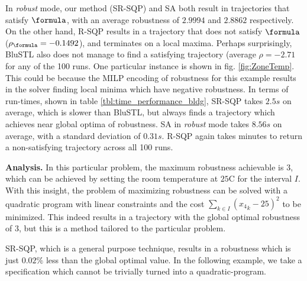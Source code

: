In \textit{robust} mode, our method (SR-SQP) and SA both result in trajectories that satisfy $\formula$, with an average robustness of $2.9994$ and $2.8862$ respectively. On the other hand, R-SQP results in a trajectory that does not satisfy $\formula$ ($\rob_{\formula} = -0.1492$), and terminates on a local maxima. Perhaps surprisingly, BluSTL also does not manage to find a satisfying trajectory (average $\rho=-2.71$ for any of the 100 runs. One particular instance is shown in fig. \ref{fig:ZoneTemp}. This could be because the MILP encoding of robustness for this example results in the solver finding local minima which have negative robustness. In terms of run-times, shown in table \ref{tbl:time_performance_bldg}, SR-SQP takes $2.5s$ on average, which is slower than BluSTL, but always finds a trajectory which achieves near global optima of robustness. SA in \textit{robust} mode takes $8.56s$ on average, with a standard deviation of $0.31s$. R-SQP again takes minutes to return a non-satisfying trajectory across all 100 runs. 

\textbf{Analysis.} In this particular problem, the maximum robustness achievable is $3$, which can be achieved by setting the room temperature at $25$C for the interval $I$. 
With this insight, the problem of maximizing robustness can be solved with a quadratic program with linear constraints and the cost $\sum_{k \in I}({x_4}_k-25)^2$ to be minimized. This indeed results in a trajectory with the global optimal robustness of $3$, but this is a method tailored to the particular problem. 

SR-SQP, which is a general purpose technique, results in a robustness which is just $0.02\%$ less than the global optimal value. In the following example, we take a specification which cannot be trivially turned into a quadratic-program.


